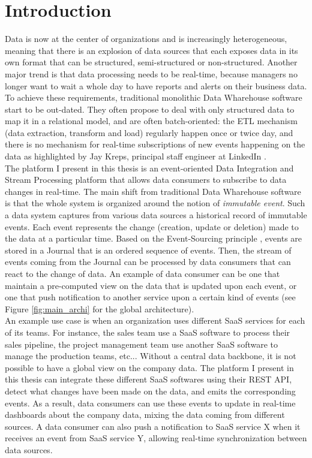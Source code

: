 \chapter{Introduction}

Data is now at the center of organizations and is increasingly heterogeneous, meaning that there is an explosion of data sources 
that each exposes data in its own format that can be structured, semi-structured or non-structured.
Another major trend is that data processing needs to be real-time, because managers no longer want to wait a whole day 
to have reports and alerts on their business data.
\\

To achieve these requirements, traditional monolithic Data Wharehouse software start to be out-dated. They often
propose to deal with only structured data to map it in a relational model, and are often batch-oriented: 
the ETL mechanism (data extraction, transform and load) regularly happen once or twice day, and there is no mechanism 
for real-time subscriptions of new events happening on the data as highlighted by Jay Kreps, principal staff engineer at LinkedIn .
\\

The platform I present in this thesis is an event-oriented Data Integration and Stream Processing platform that allows data consumers
to subscribe to data changes in real-time. The main shift from traditional Data Wharehouse software is that the whole
system is organized around the notion of \textit{immutable event}. Such a data system captures from various data sources
a historical record of immutable events. Each event represents the change (creation, update or deletion) made to the data at a particular time. 
Based on the Event-Sourcing principle , events are stored in a Journal that is an ordered sequence of 
events. Then, the stream of events coming from the Journal can be processed by data consumers that can react to the change of data. 
An example of data consumer can be one that maintain a pre-computed view on the data that is updated upon each event, or one that push 
notification to another service upon a certain kind of events (see Figure \ref{fig:main_archi} for the global architecture).
\\

An example use case is when an organization uses different SaaS services for each of its teams. For instance, the sales
team use a SaaS software to process their sales pipeline, the project management team use another SaaS software to manage
the production teams, etc... Without a central data backbone, it is not possible to have a global view on the company data.
The platform I present in this thesis can integrate these different SaaS softwares using their REST API, detect what
changes have been made on the data, and emits the corresponding events. As a result, data consumers can use these events
to update in real-time dashboards about the company data, mixing the data coming from different sources. A data consumer can also push a
notification to SaaS service X when it receives an event from SaaS service Y, allowing real-time synchronization between
data sources.
\\

